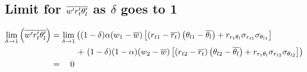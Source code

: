 \subsection{Limit for \texorpdfstring{$\overline{w' r_t' \theta_l'}$}{wprimertprimethetalbar} as \texorpdfstring{$\delta$}{delta} goes to 1}
\label{subsec:limit-for-wprimertprimethetalbar-as-delta-goes-to-1}

\begin{align}
    \label{eq:limit_wprimertprimethetalbar_delta_to_1}
    \lim_{\delta \to 1}\left(\overline{w' r_t' \theta_l'}\right)
    &= \lim_{\delta \to 1}
    \left(
    (1 - \delta) \alpha (w_1 - \overline{w}) \left[
        \left(r_{t1} - \overline{r_t}\right)
        \left(\theta_{l1} - \overline{\theta_l}\right) +
        r_{r_t \theta_l} \sigma_{r_{t1}} \sigma_{\theta_{l1}}
        \right] \right.\nonumber\\
    &\quad\quad\quad+ \left.(1 - \delta) (1 - \alpha) (w_2 - \overline{w}) \left[
        \left(r_{t2} - \overline{r_t}\right)
        \left(\theta_{l2} - \overline{\theta_l}\right) +
        r_{r_t \theta_l} \sigma_{r_{t2}} \sigma_{\theta_{l2}}
        \right]
    \right) \nonumber\\
    &=\quad 0
\end{align}